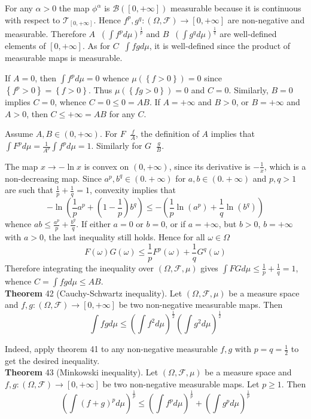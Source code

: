 \documentclass[a4paper]{article}
\newcommand{\obj}[1]{\left\{ #1 \right \}}
\newcommand{\clo}[1]{\left [ #1 \right ]}
\newcommand{\brac}[1]{\left ( #1 \right )}
\newcommand{\Zinf}{\clo{ 0, +\infty }}
\newcommand{\Tcal}{\mathcal{T}}
\newcommand{\Fcal}{\mathcal{F}}
\newcommand{\borel}[1]{\mathcal{B}\brac{#1}}
\newcommand{\defn}{\mathop{\overset{\Delta}{=}}\nolimits}
\begin{document}
For any $\alpha>0$ the map $\phi^\alpha$ is $\borel{\Zinf}$ measurable because it is continuous with respect to $\Tcal_{\Zinf}$. Hence $f^p,g^q:\brac{\Omega, \Fcal}\to\Zinf$ are non-negative and measurable. Therefore $A\defn \brac{\int f^p d\mu}^\frac{1}{p}$ and $B\defn \brac{\int g^q d\mu}^\frac{1}{q}$ are well-defined elements of $\Zinf$. As for $C\defn \int f g d\mu$, it is well-defined since the product of measurable maps is measurable.

If $A=0$, then $\int f^p d\mu = 0$ whence $\mu\brac{\obj{f>0}}=0$ since $\obj{f^p>0}=\obj{f>0}$. Thus $\mu\brac{\obj{f g > 0 }} = 0$ and $C=0$. Similarly, $B=0$ implies $C=0$, whence $C = 0\leq 0 = A B$. If $A=+\infty$ and $B>0$, or $B=+\infty$ and $A>0$, then $C\leq +\infty = A B$ for any $C$. 

Assume $A,B\in \brac{0,+\infty}$. For $F\defn \frac{f}{A}$, the definition of $A$ implies that $\int F^p d\mu = \frac{1}{A^p} \int f^p d\mu = 1$. Similarly for $G\defn \frac{g}{B}$.

The map $x\to-\ln{x}$ is convex on $\brac{0,+\infty}$, since its derivative is $-\frac{1}{x}$, which is a non-decreasing map. Since $a^p, b^q\in \brac{0.+\infty}$ for $a,b\in \brac{0.+\infty}$ and $p,q>1$ are such that $\frac{1}{p}+\frac{1}{q}=1$, convexity implies that \[-\ln\brac{ \frac{1}{p}a^p + \brac{1-\frac{1}{p}}b^q }\leq -\brac{\frac{1}{p}\ln\brac{ a^p } + \frac{1}{q}\ln\brac{ b^q }}\] whence $a b \leq \frac{a^p}{p} + \frac{b^q}{q}$. If either $a=0$ or $b=0$, or if $a=+\infty$, but $b>0$, $b=+\infty$ with $a>0$, the last inequality still holds. Hence for all $\omega\in \Omega$\[F\brac{\omega} G\brac{\omega}\leq \frac{1}{p} F^p\brac{\omega} + \frac{1}{q} G^q\brac{\omega}\] Therefore integrating the inequality over $\brac{\Omega, \Fcal, \mu}$ gives $\int F G d\mu \leq \frac{1}{p}+\frac{1}{q}=1$, whence $C = \int f g d\mu \leq A B$.\\

\label{thm:cauchy_schwartz} \noindent \textbf{Theorem} 42 (Cauchy-Schwartz inequality).
Let $\brac{\Omega, \Fcal, \mu}$ be a measure space and $f,g:\brac{\Omega, \Fcal}\to \Zinf$ be two non-negative measurable maps. Then\[\int f g d\mu \leq \brac{ \int f^2 d\mu }^{\frac{1}{2}} \brac{ \int g^2 d\mu }^{\frac{1}{2}}\]

Indeed, apply theorem 41 to any non-negative measurable $f,g$ with $p=q=\frac{1}{2}$ to get the desired inequality.\\

\label{thm:minkowski} \noindent \textbf{Theorem} 43 (Minkowski inequality).
Let $\brac{\Omega, \Fcal, \mu}$ be a measure space and $f,g:\brac{\Omega, \Fcal}\to \Zinf$ be two non-negative measurable maps. Let $p\geq 1$. Then\[\brac{\int \brac{f+g}^p d\mu}^\frac{1}{p} \leq \brac{ \int f^p d\mu }^\frac{1}{p} + \brac{ \int g^p d\mu }^\frac{1}{p}\]
\end{document}

